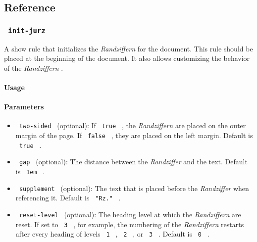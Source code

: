 \subsection{Reference}\label{reference}

\subsubsection{\texorpdfstring{\texttt{\ init-jurz\ }}{ init-jurz }}\label{init-jurz}

A show rule that initializes the \emph{Randziffern} for the document.
This rule should be placed at the beginning of the document. It also
allows customizing the behavior of the \emph{Randziffern} .

\paragraph{Usage}\label{usage}

\begin{Shaded}
\begin{Highlighting}[]
\NormalTok{)}
\end{Highlighting}
\end{Shaded}

\paragraph{Parameters}\label{parameters}

\begin{itemize}
\tightlist
\item
  \texttt{\ two-sided\ } (optional): If \texttt{\ true\ } , the
  \emph{Randziffern} are placed on the outer margin of the page. If
  \texttt{\ false\ } , they are placed on the left margin. Default is
  \texttt{\ true\ } .
\item
  \texttt{\ gap\ } (optional): The distance between the
  \emph{Randziffer} and the text. Default is \texttt{\ 1em\ } .
\item
  \texttt{\ supplement\ } (optional): The text that is placed before the
  \emph{Randziffer} when referencing it. Default is \texttt{\ "Rz."\ } .
\item
  \texttt{\ reset-level\ } (optional): The heading level at which the
  \emph{Randziffern} are reset. If set to \texttt{\ 3\ } , for example,
  the numbering of the \emph{Randziffern} restarts after every heading
  of levels \texttt{\ 1\ } , \texttt{\ 2\ } , or \texttt{\ 3\ } .
  Default is \texttt{\ 0\ } .
\end{itemize}

